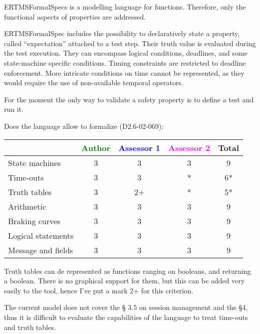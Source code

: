 \begin{author_comment}
ERTMSFormalSpecs is a modelling language for functions. Therefore, only the functional aspects of properties are addressed.  
\end{author_comment}

\begin{assessor1}
ERTMSFormalSpec includes the possibility to declaratively state a property, called "`expectation"' attached to a test step. Their truth value is evaluated during the test execution. They can encompass logical conditions, deadlines, and some state-machine specific conditions. 
Timing constraints are restricted to deadline enforcement. More intricate conditions on time cannot be represented, as they would require the use of non-available temporal operators. 
\end{assessor1}


\begin{assessor2}
For the moment the only way to validate a safety property is to define a test and run it.
\end{assessor2}

Does the language allow to  formalize (D2.6-02-069):

\begin{tabular}{|l | c | c | c | c|}
\hline
& \textcolor{green}{Author} & \textcolor{blue}{Assessor 1} & \textcolor{magenta}{Assessor 2} & Total \\
\hline 
State machines  & 3 & 3 & 3 & 9 \\
\hline
Time-outs  & 3 & 3 & * & 6*  \\
\hline
Truth tables  & 3 & 2+ & * & 5*  \\
\hline
Arithmetic  & 3 & 3 & 3 & 9  \\
\hline
Braking curves  & 3 & 3 & 3 & 9 \\
\hline
Logical statements & 3 & 3 & 3 & 9  \\
\hline
Message and fields & 3 & 3 & 3 & 9 \\
\hline
\end{tabular}

\begin{assessor1}
Truth tables can de represented as functions ranging on booleans, and returning a boolean. There is no graphical support for them, but this can be added very easily to the tool, hence I've put a mark 2+ for this criterion. 
\end{assessor1}


\begin{assessor2}
The current model does not cover the §  3.5 on session management and the §4, thus it is difficult to evaluate the capabilities of the language to treat time-outs and truth tables.
\end{assessor2}


